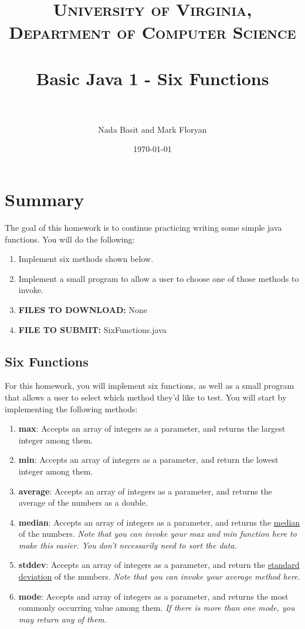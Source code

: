 \documentclass[paper=a4, fontsize=11pt, parskip=full]{scrartcl} %
\title{	
\normalfont \normalsize 
\textsc{University of Virginia, Department of Computer Science} \\ [25pt] %
\horrule{0.5pt} \\[0.4cm] %
\huge Basic Java 1 - Six Functions \\ %
\horrule{2pt} \\[0.5cm] %
}
\author{Nada Basit and Mark Floryan}
\date{\normalsize\today} %
\numberwithin{equation}{section} %
\numberwithin{figure}{section} %
\numberwithin{table}{section} %
\begin{document}
\maketitle %

\section{Summary}

The goal of this homework is to continue practicing writing some simple java functions. You will do the following:

\begin{enumerate}
	\item Implement six methods shown below.
	\item Implement a small program to allow a user to choose one of those methods to invoke.
	\item \textbf{FILES TO DOWNLOAD:} None
	\item \textbf{FILE TO SUBMIT:} SixFunctions.java
\end{enumerate}

\subsection{Six Functions}

For this homework, you will implement six functions, as well as a small program that allows a user to select which method they'd like to test. You will start by implementing the following methods:

\begin{enumerate}
\item \textbf{max}: Accepts an array of integers as a parameter, and returns the largest integer among them.
\item \textbf{min}: Accepts an array of integers as a parameter, and return the lowest integer among them.
\item \textbf{average}: Accepts an array of integers as a parameter, and returns the average of the numbers as a double.
\item \textbf{median}: Accepts an array of integers as a parameter, and returns the \href{https://en.wikipedia.org/wiki/Median}{median} of the numbers. \emph{Note that you can invoke your max and min function here to make this easier. You don't necessarily need to sort the data.} 
\item \textbf{stddev}: Accepts an array of integers as a parameter, and return the \href{https://en.wikipedia.org/wiki/Standard_deviation}{standard deviation} of the numbers. \emph{Note that you can invoke your average method here.}
\item \textbf{mode}: Accepts and array of integers as a parameter, and returns the most commonly occurring value among them. \emph{If there is more than one mode, you may return any of them.}
\end{enumerate}
\end{document}
